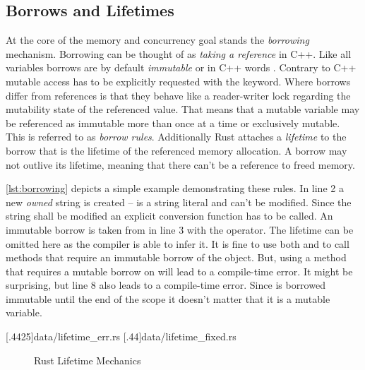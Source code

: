 \documentclass[thesis]{subfiles}
\begin{document}
  \subsection{Borrows and Lifetimes}\label{sec:rustBorr}
    At the core of the memory and concurrency goal stands the \emph{borrowing} mechanism.
    Borrowing can be thought of as \emph{taking a reference} in C++.
    Like all variables borrows are by default \emph{immutable} or in C++ words .
    Contrary to C++ mutable access has to be explicitly requested with the  keyword.
    Where borrows differ from references is that they behave like a reader-writer lock regarding the mutability state of the referenced value.
    That means that a mutable variable may be referenced as immutable more than once at a time or exclusively mutable.
    This is referred to as \emph{borrow rules}.
    Additionally Rust attaches a \emph{lifetime} to the borrow that is the lifetime of the referenced memory allocation.
    A borrow may not outlive its lifetime, meaning that there can't be a reference to freed memory.


    \autoref{lst:borrowing} depicts a simple example demonstrating these rules.
    In line 2 a new \emph{owned} string is created --  is a string literal and can't be modified.
    Since the string shall be modified an explicit conversion function has to be called.
    An immutable borrow is taken from  in line 3 with the \codr{&} operator.
    The lifetime can be omitted here as the compiler is able to infer it.
    It is fine to use both  and  to call methods that require an immutable borrow of the object.
    But, using a method that requires a mutable borrow on  will lead to a compile-time error.
    It might be surprising, but line 8 also leads to a compile-time error.
    Since  is borrowed immutable until the end of the scope it doesn't matter that it is a mutable variable.

    \LstTikzBox{\lifetimeErrBox}[.4425\linewidth]{data/lifetime_err.rs}
    \LstTikzBox{\lifetimeFixBox}[.44\linewidth]{data/lifetime_fixed.rs}
    \begin{figure}[ht]
      \captionsetup{type=lstlisting}
      \hfill%
      \caption{Rust Lifetime Mechanics}\label{lst:lifetime}
    \end{figure}
\end{document}

